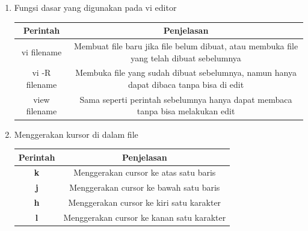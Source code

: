 \begin{enumerate}
\item Fungsi dasar yang digunakan pada vi editor
\begin{table}[h]
		\begin{tabular}{|c|c|}
			\hline
			Perintah & Penjelasan\\
			\hline
			vi filename&Membuat file baru jika file belum dibuat, atau membuka file yang telah dibuat sebelumnya\\
			\hline
			vi -R filename&Membuka file yang sudah dibuat sebelumnya, namun hanya dapat dibaca tanpa bisa di edit\\
			\hline
			view filename&Sama seperti perintah sebelumnya hanya dapat membaca tanpa bisa melakukan edit\\
			\hline
		\end{tabular}
		\label{table:fungsi dasar}
	\end{table}

\item Menggerakan kursor di dalam file
\begin{table}[h]
		\begin{tabular}{|c|c|}
			\hline
			Perintah & Penjelasan\\
			\hline
			\textbf{k}&Menggerakan cursor ke atas satu baris\\
			\hline
			\textbf{j}&Menggerakan cursor ke bawah satu baris\\
			\hline
			\textbf{h}&Menggerakan cursor ke kiri satu karakter\\
			\hline
			\textbf{l}&Menggerakan cursor ke kanan satu karakter\\
			\hline
		\end{tabular}
		\label{table:menggerakan cursor}
	\end{table}
\end{enumerate}